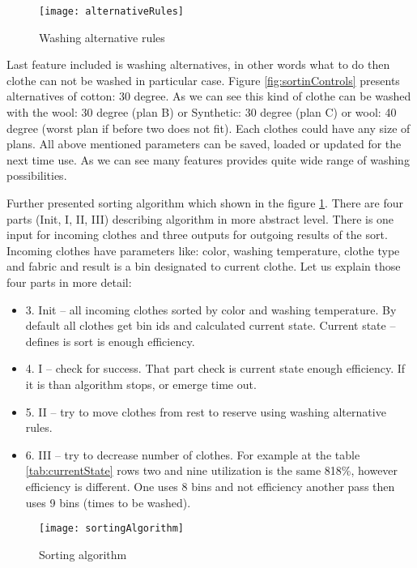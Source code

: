 \begin{figure}[h]
	\centering
		\texttt{[image: alternativeRules]}
	\caption{Washing alternative rules}
	\label{fig:alternativeRules}
\end{figure}

Last feature included is washing alternatives, in other words what to do then clothe can not be washed in particular case. Figure \ref{fig:sortinControls} presents alternatives of cotton: 30 degree. As we can see this kind of clothe can be washed with the wool: 30 degree (plan B) or Synthetic: 30 degree (plan C) or wool: 40 degree (worst plan if before two does not fit). Each clothes could have any size of plans. All above mentioned parameters can be saved, loaded or updated for the next time use. As we can see many features provides quite wide range of washing possibilities.

Further presented sorting algorithm which shown in the figure \ref{fig:alternativeRules}. There are four parts (Init, I, II, III) describing algorithm in more abstract level. There is one input for incoming clothes and three outputs for outgoing results of the sort. Incoming clothes have parameters like: color, washing temperature, clothe type and fabric and result is a bin designated to current clothe.  Let us explain those four parts in more detail:

\begin{itemize}
	\item 3. Init – all incoming clothes sorted by color and washing temperature. By default all clothes get bin ids and calculated current state. Current state – defines is sort is enough efficiency.
	\item 4. I – check for success. That part check is current state enough efficiency. If it is than algorithm stops, or emerge time out.
	\item 5. II – try to move clothes from rest to reserve using washing alternative rules. 
	\item 6. III – try to decrease number of clothes. For example at the table \ref{tab:currentState} rows two and nine utilization is the same 818\%, however efficiency is different. One uses 8 bins and not efficiency another pass then uses 9 bins (times to be washed).
\end{itemize}

\begin{figure}[h]
	\centering
		\texttt{[image: sortingAlgorithm]}
	\caption{Sorting algorithm}
	\label{fig:sortingAlgorithm}
\end{figure}

